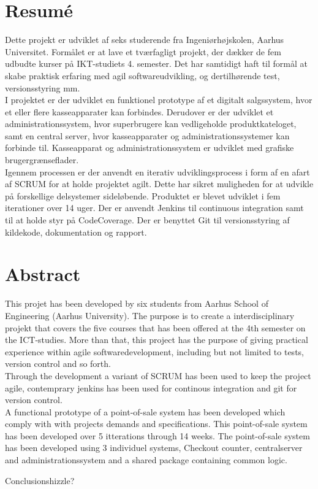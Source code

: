 \section*{Resumé}
Dette projekt er udviklet af seks studerende fra Ingeniørhøjskolen, Aarhus Universitet. Formålet er at lave et tværfagligt projekt, der dækker de fem udbudte kurser på IKT-studiets 4. semester. Det har samtidigt haft til formål at skabe praktisk erfaring med agil softwareudvikling, og dertilhørende test, versionsstyring mm.\\

I projektet er der udviklet en funktionel prototype af et digitalt salgssystem, hvor et eller flere kasseapparater kan forbindes. Derudover er der udviklet et administrationssystem, hvor superbrugere kan vedligeholde produktkateloget, samt en central server, hvor kasseapparater og administrationssystemer kan forbinde til. Kasseapparat og administrationssystem er udviklet med grafiske brugergrænseflader.\\

Igennem processen er der anvendt en iterativ udviklingsprocess i form af en afart af SCRUM for at holde projektet agilt. Dette har sikret muligheden for at udvikle på forskellige delsystemer sideløbende. Produktet er blevet udviklet i fem iterationer over 14 uger. Der er anvendt Jenkins til continuous integration samt til at holde styr på CodeCoverage. Der er benyttet Git til versionsstyring af kildekode, dokumentation og rapport.


\section*{Abstract}
This projet has been developed by six students from Aarhus School of Engineering (Aarhus University). The purpose is to create a interdisciplinary projekt that covers the five courses that has been offered at the 4th semester on the ICT-studies. More than that, this project has the purpose of giving practical experience within agile softwaredevelopment, including but not limited to tests, version control and so forth.\\
Through the development a variant of SCRUM has been used to keep the project agile, contemprary jenkins has been used for continous integration and git for version control.\\
A functional prototype of a point-of-sale system has been developed which comply with with projects demands and specifications. This point-of-sale system has been developed over 5 itterations through 14 weeks. The point-of-sale system has been developed using 3 individuel systems, Checkout counter, centralserver and administrationssystem and a shared package containing common logic.

Conclusionshizzle?